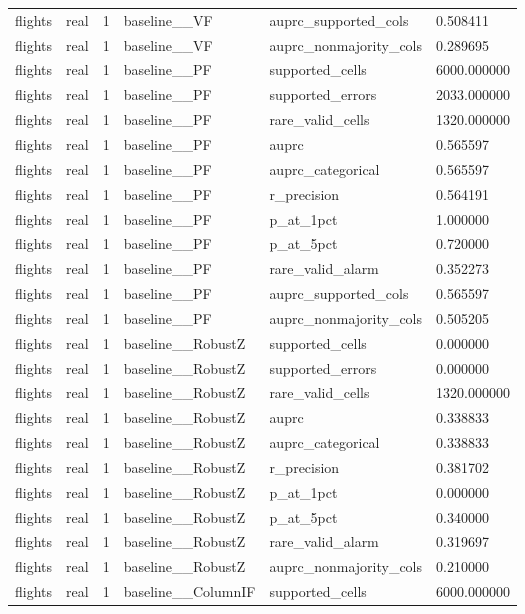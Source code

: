 \begin{tabular}{llllll}
flights & real & 1 & baseline\_\_VF & auprc\_supported\_cols & 0.508411 \\
flights & real & 1 & baseline\_\_VF & auprc\_nonmajority\_cols & 0.289695 \\
flights & real & 1 & baseline\_\_PF & supported\_cells & 6000.000000 \\
flights & real & 1 & baseline\_\_PF & supported\_errors & 2033.000000 \\
flights & real & 1 & baseline\_\_PF & rare\_valid\_cells & 1320.000000 \\
flights & real & 1 & baseline\_\_PF & auprc & 0.565597 \\
flights & real & 1 & baseline\_\_PF & auprc\_categorical & 0.565597 \\
flights & real & 1 & baseline\_\_PF & r\_precision & 0.564191 \\
flights & real & 1 & baseline\_\_PF & p\_at\_1pct & 1.000000 \\
flights & real & 1 & baseline\_\_PF & p\_at\_5pct & 0.720000 \\
flights & real & 1 & baseline\_\_PF & rare\_valid\_alarm & 0.352273 \\
flights & real & 1 & baseline\_\_PF & auprc\_supported\_cols & 0.565597 \\
flights & real & 1 & baseline\_\_PF & auprc\_nonmajority\_cols & 0.505205 \\
flights & real & 1 & baseline\_\_RobustZ & supported\_cells & 0.000000 \\
flights & real & 1 & baseline\_\_RobustZ & supported\_errors & 0.000000 \\
flights & real & 1 & baseline\_\_RobustZ & rare\_valid\_cells & 1320.000000 \\
flights & real & 1 & baseline\_\_RobustZ & auprc & 0.338833 \\
flights & real & 1 & baseline\_\_RobustZ & auprc\_categorical & 0.338833 \\
flights & real & 1 & baseline\_\_RobustZ & r\_precision & 0.381702 \\
flights & real & 1 & baseline\_\_RobustZ & p\_at\_1pct & 0.000000 \\
flights & real & 1 & baseline\_\_RobustZ & p\_at\_5pct & 0.340000 \\
flights & real & 1 & baseline\_\_RobustZ & rare\_valid\_alarm & 0.319697 \\
flights & real & 1 & baseline\_\_RobustZ & auprc\_nonmajority\_cols & 0.210000 \\
flights & real & 1 & baseline\_\_ColumnIF & supported\_cells & 6000.000000 \\

\end{tabular}
